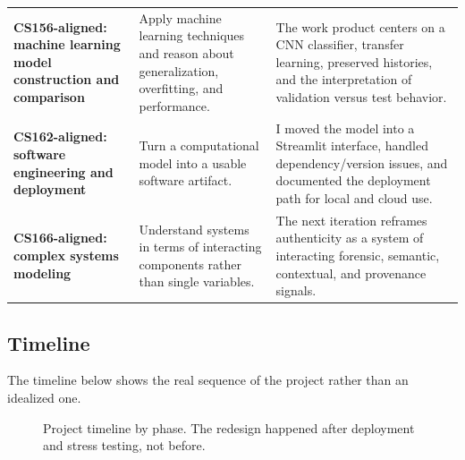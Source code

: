 \documentclass[11pt]{article}
\begin{document}
\begin{longtable}{p{3.1cm}p{4.9cm}p{6.8cm}}
\textbf{CS156-aligned: machine learning model construction and comparison} & Apply machine learning techniques and reason about generalization, overfitting, and performance. & The work product centers on a CNN classifier, transfer learning, preserved histories, and the interpretation of validation versus test behavior. \\

\textbf{CS162-aligned: software engineering and deployment} & Turn a computational model into a usable software artifact. & I moved the model into a Streamlit interface, handled dependency/version issues, and documented the deployment path for local and cloud use. \\

\textbf{CS166-aligned: complex systems modeling} & Understand systems in terms of interacting components rather than single variables. & The next iteration reframes authenticity as a system of interacting forensic, semantic, contextual, and provenance signals. \\
\bottomrule
\end{longtable}

\subsection{Timeline}
The timeline below shows the real sequence of the project rather than an idealized one.

\begin{figure}[H]
\centering
{}
\caption{Project timeline by phase. The redesign happened after deployment and stress testing, not before.}
\label{fig:timeline}
\end{figure}
\end{document}
